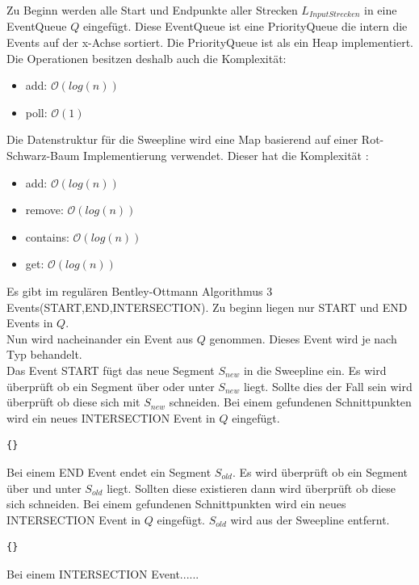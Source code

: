 \documentclass[conference]{IEEEtran}
\begin{document}
	Zu Beginn werden alle Start und Endpunkte aller Strecken $L_{InputStrecken}$ in eine EventQueue $Q$ eingefügt. Diese EventQueue ist eine PriorityQueue die intern die Events auf der x-Achse sortiert. Die PriorityQueue ist als ein Heap implementiert. Die Operationen besitzen deshalb auch die Komplexität:
	\begin{itemize}
		\item add: $\mathcal{O}(log(n))$
		\item poll: $\mathcal{O}(1)$
	\end{itemize}
	Die Datenstruktur für die Sweepline wird eine Map basierend auf einer Rot-Schwarz-Baum Implementierung verwendet. Dieser hat die Komplexität \cite{b1}:
	\begin{itemize}
		\item add: $\mathcal{O}(log(n))$
		\item remove: $\mathcal{O}(log(n))$
		\item contains: $\mathcal{O}(log(n))$
		\item get: $\mathcal{O}(log(n))$
	\end{itemize}
	Es gibt im regulären Bentley-Ottmann Algorithmus 3 Events(START,END,INTERSECTION).
	Zu beginn liegen nur START und END Events in $Q$.\\
	Nun wird nacheinander ein Event aus $Q$ genommen. Dieses Event wird je nach Typ behandelt.\\
	Das Event START fügt das neue Segment $S_{new}$ in die Sweepline ein.
	Es wird überprüft ob ein Segment über oder unter $S_{new}$ liegt. Sollte dies der Fall sein wird überprüft ob diese sich mit $S_{new}$ schneiden. Bei einem gefundenen Schnittpunkten wird ein neues INTERSECTION Event in $Q$ eingefügt.
	\begin{lstlisting}[basicstyle=\tiny]
	{}
	\end{lstlisting}
	Bei einem END Event endet ein Segment $S_{old}$. Es wird überprüft ob ein Segment über und unter $S_{old}$ liegt. Sollten diese existieren dann wird überprüft ob diese sich schneiden. Bei einem gefundenen Schnittpunkten wird ein neues INTERSECTION Event in $Q$ eingefügt. $S_{old}$ wird aus der Sweepline entfernt.
	\begin{lstlisting}[basicstyle=\tiny]
		{}
	\end{lstlisting}
	Bei einem INTERSECTION Event......
	
\end{document}
